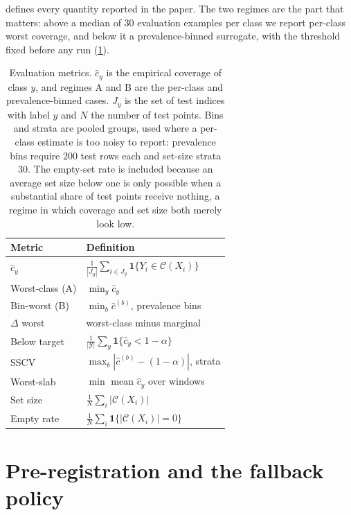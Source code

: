  defines every quantity reported in the paper. The two regimes are the part
that matters: above a median of $30$ evaluation examples per class we report per-class worst
coverage, and below it a prevalence-binned surrogate, with the threshold fixed before any run
(\cref{app:prereg}).

\begin{table}[h]
\centering
\small
\setlength{\tabcolsep}{3pt}
\begin{tabular}{@{}ll@{}}
\toprule
Metric & Definition \\
\midrule
$\hat c_y$
  & $\frac{1}{|J_y|}\sum_{i\in J_y}\mathbf{1}\{Y_i\in\mathcal{C}(X_i)\}$ \\[2pt]
Worst-class (A)
  & $\min_{y}\hat c_y$ \\[2pt]
Bin-worst (B)
  & $\min_{b}\hat c^{(b)}$, prevalence bins \\[2pt]
$\Delta$ worst
  & worst-class minus marginal \\[2pt]
Below target
  & $\frac{1}{|\mathcal{Y}|}\sum_y\mathbf{1}\{\hat c_y<1-\alpha\}$ \\[2pt]
SSCV
  & $\max_{b}|\hat c^{(b)}-(1-\alpha)|$, strata \\[2pt]
Worst-slab
  & $\min$ mean $\hat c_y$ over windows \\[2pt]
Set size
  & $\frac{1}{N}\sum_i|\mathcal{C}(X_i)|$ \\[2pt]
Empty rate
  & $\frac{1}{N}\sum_i\mathbf{1}\{|\mathcal{C}(X_i)|=0\}$ \\
\bottomrule
\end{tabular}
\caption{Evaluation metrics. $\hat c_y$ is the empirical coverage of class $y$, and regimes A and B are the per-class and prevalence-binned cases. $J_y$ is the set of test indices with label $y$ and $N$ the
number of test points. Bins and strata are pooled groups, used where a per-class estimate is
too noisy to report: prevalence bins require $200$ test rows each and set-size strata $30$.
The empty-set rate is included because an average set size below one is only possible when a
substantial share of test points receive nothing, a regime in which coverage and set size both
merely look low.}
\label{tab:metrics}
\end{table}

\section{Pre-registration and the fallback policy}
\label{app:prereg}

